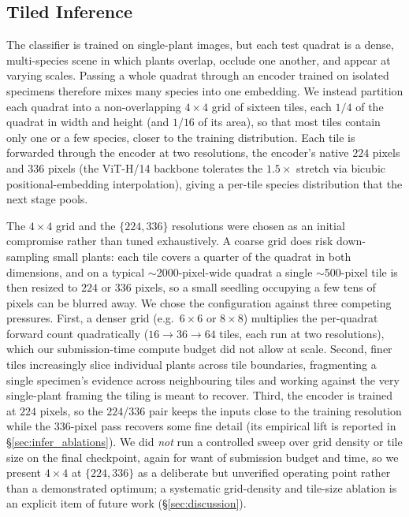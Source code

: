 \subsection{Tiled Inference}
\label{sec:adaptive_inference}

The classifier is trained on single-plant images, but each test quadrat is a dense, multi-species
scene in which plants overlap, occlude one another, and appear at varying scales. Passing a whole
quadrat through an encoder trained on isolated specimens therefore mixes many species into one
embedding. We instead partition each quadrat into a non-overlapping
$4\times4$ grid of sixteen tiles, each $1/4$ of the quadrat in width and height (and $1/16$ of
its area), so that most tiles contain only one or a few species, closer to the training
distribution. Each tile is forwarded through the encoder
at two resolutions, the encoder's native $224$ pixels and $336$ pixels (the ViT-H/14 backbone
tolerates the $1.5\times$ stretch via bicubic positional-embedding interpolation), giving a
per-tile species distribution that the next stage pools.

The $4\times4$ grid and the $\{224, 336\}$ resolutions were chosen as an initial compromise rather
than tuned exhaustively. A coarse grid does risk down-sampling small plants: each tile covers a
quarter of the quadrat in both dimensions, and on a typical $\sim$2000-pixel-wide quadrat a single
$\sim$500-pixel tile is then resized to $224$ or $336$ pixels, so a small seedling occupying a few
tens of pixels can be blurred away. We chose the configuration against three competing pressures.
First, a denser grid (e.g.\ $6\times6$ or $8\times8$) multiplies the per-quadrat forward count
quadratically ($16\to36\to64$ tiles, each run at two resolutions), which our submission-time
compute budget did not allow at scale. Second, finer tiles increasingly slice individual plants
across tile boundaries, fragmenting a single specimen's evidence across neighbouring tiles and
working against the very single-plant framing the tiling is meant to recover. Third, the encoder is
trained at $224$ pixels, so the $224$/$336$ pair keeps the inputs close to the training resolution
while the $336$-pixel pass recovers some fine detail (its empirical lift is reported in
\S\ref{sec:infer_ablations}). We did \emph{not} run a controlled sweep over grid density or tile
size on the final checkpoint, again for want of submission budget and time, so we present
$4\times4$ at $\{224, 336\}$ as a deliberate but unverified operating point rather than a
demonstrated optimum; a systematic grid-density and tile-size ablation is an explicit item of
future work (\S\ref{sec:discussion}).

